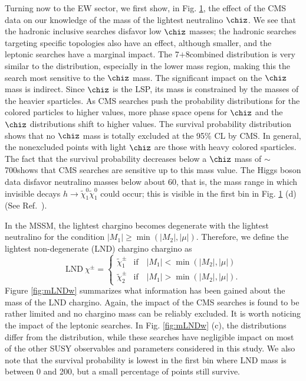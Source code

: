 Turning now to the EW sector, we first show, in
Fig. \ref{fig:mz1}, the effect of the CMS data on our knowledge of the
mass of the lightest neutralino $\chiz$.  We see that the hadronic
inclusive searches disfavor low $\chiz$ masses; the hadronic
searches targeting specific topologies also have an effect, although
smaller, and the leptonic searches have a marginal impact.  The
7$+$8\TeV combined distribution is very similar to the \MTtwo{}
distribution, especially in the lower mass region, making this the
search most sensitive to the $\chiz$ mass.  The
significant impact on the $\chiz$ mass is indirect.  Since $\chiz$ is
the LSP, its mass is constrained by the masses of
the heavier sparticles.  As CMS searches push the probability
distributions for the colored particles to higher values, more phase
space opens for $\chiz$ and the $\chiz$ distributions shift to higher
values.  The survival probability distribution shows that no $\chiz$
mass is totally excluded at the 95\% CL by CMS.  In general, the nonexcluded points with light $\chiz$ are those with heavy colored sparticles.  The fact that the survival probability decreases below a $\chiz$ mass of $\sim$700\GeV shows that CMS searches are sensitive up to this mass value.
The Higgs boson data disfavor neutralino masses below about 60\GeV, that is,
the mass range in which invisible decays
$h\to\tilde\chi^0_1\tilde\chi^0_1$ could occur; this is visible in the
first bin in Fig. \ref{fig:mz1} (d) (See Ref.~\cite{Bernon:2014vta}).

\begin{figure}[t]
    \vspace{1mm}
    \caption{}
    \label{fig:mz1}
\end{figure}


In the MSSM, the lightest chargino becomes degenerate with the lightest neutralino for the condition 
$|M_1| \geq \min(|M_2|,|\mu|)$.  
Therefore, we define the lightest non-degenerate (LND) chargino
chargino as
\begin{equation}
    \mathrm{LND~}{\chi^\pm} =
    \begin{cases}
        \tilde{\chi}^\pm_1 & \mbox{if~~~} |M_1| < \min(|M_2|,|\mu|) \\
        \tilde{\chi}^\pm_2 & \mbox{if~~~} |M_1| > \min(|M_2|,|\mu|).
    \end{cases}
\end{equation}
Figure \ref{fig:mLNDw} summarizes what information has been gained about the mass of the 
LND chargino. 
Again, the impact of the CMS searches is found to be rather limited and no chargino mass
can be reliably excluded.
It is worth noticing the impact of the leptonic searches.
In Fig. \ref{fig:mLNDw} (c), the distributions differ from the \preCMS distribution,
while these searches have negligible impact on most of the other  SUSY observables and parameters considered in this study. We also note that the survival probability is lowest in the first bin where LND mass is between 0 and 200\GeV, but a small percentage of points still survive.

